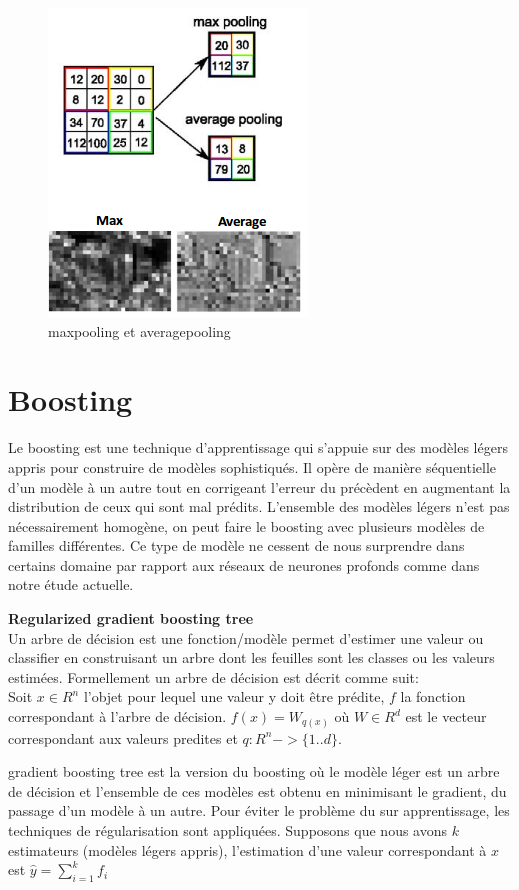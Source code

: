 \begin{figure}[H]
    \centering
    \includegraphics[scale = 0.5]{images/average_max.png}
    \caption{maxpooling et averagepooling}
\end{figure}


\section{Boosting}
Le boosting est une technique d'apprentissage qui s'appuie sur des modèles légers appris pour construire de modèles sophistiqués. Il opère de manière séquentielle d'un modèle à un autre tout en corrigeant l'erreur du précèdent en augmentant la distribution de ceux qui sont mal prédits. L'ensemble des modèles légers n'est pas nécessairement homogène, on peut faire le boosting avec plusieurs modèles de familles différentes. Ce type de modèle ne cessent de nous surprendre dans certains domaine par rapport aux réseaux de neurones profonds comme dans notre étude actuelle.

\textbf{Regularized gradient boosting tree}\\
Un arbre de décision est une fonction/modèle permet d'estimer une valeur ou classifier en construisant un arbre dont les feuilles sont les classes ou les valeurs estimées. Formellement un arbre de décision est décrit comme suit: \\ Soit $x \in R^n$ l'objet pour lequel une valeur y doit être prédite, $f$ la fonction correspondant à l'arbre de décision.
$f(x) = W_{q(x)}$ où $W \in R^d$  est le vecteur correspondant aux valeurs predites et $q: R^n -> \{1..d\}$.

gradient boosting tree est la version du boosting où le modèle léger est un arbre de décision et l'ensemble de ces modèles est obtenu en minimisant le gradient, du passage d'un modèle à un autre. Pour éviter le problème du sur apprentissage, les techniques de régularisation sont appliquées. Supposons que nous avons $k$ estimateurs (modèles légers appris), l'estimation d'une valeur correspondant à $x$ est $\widehat{y} = \sum \limits_{i=1}^k f_i $ 

